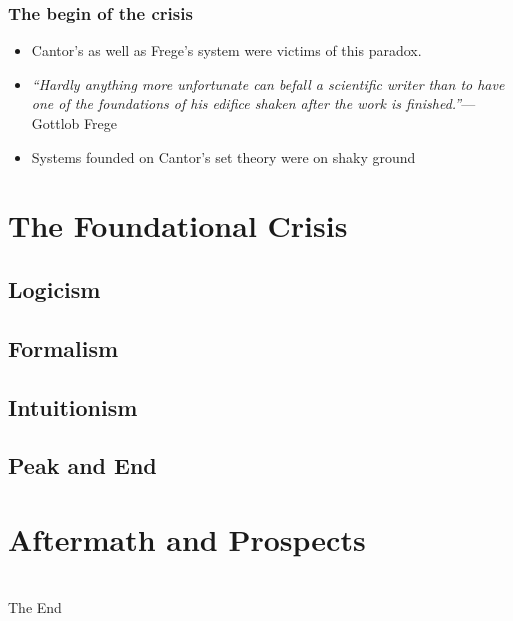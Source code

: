 \documentclass{beamer}
\begin{document}
\begin{frame}
    \frametitle{The begin of the crisis}
    \begin{itemize}[<+->]
	\item Cantor's as well as Frege's system were victims of this paradox.
	\item \textit{``Hardly anything more unfortunate can befall a scientific writer than to have one of the foundations of his edifice shaken after the work is finished.''\cite{frege_appendix}}\hfill--- Gottlob Frege
	\item Systems founded on Cantor's set theory were on shaky ground
    \end{itemize}
\end{frame}
\section{The Foundational Crisis}
\subsection{Logicism}
\begin{frame}
    \frametitle{}
\end{frame}
\subsection{Formalism}
\begin{frame}
    \frametitle{}
\end{frame}
\subsection{Intuitionism}
\begin{frame}
    \frametitle{}
\end{frame}
\subsection{Peak and End}
\begin{frame}
    \frametitle{}
\end{frame}
\section{Aftermath and Prospects}
\begin{frame}
    \frametitle{}
\end{frame}
\section*{}
\begin{frame}
    \Huge{\centerline{The End}}
\end{frame}

\newpage


\end{document}
